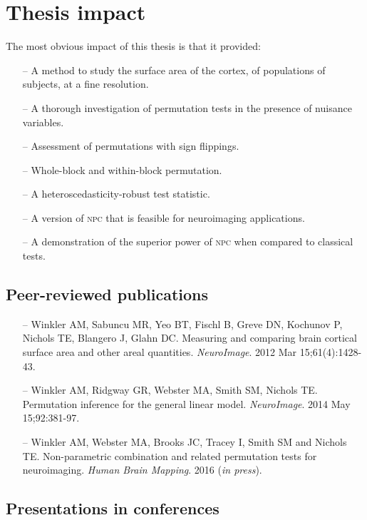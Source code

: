 \section{Thesis impact}

The most obvious impact of this thesis is that it provided:

\begin{itemize}
\item[--] A method to study the surface area of the cortex, of populations of subjects, at a fine resolution.
\item[--] A thorough investigation of permutation tests in the presence of nuisance variables.
\item[--] Assessment of permutations with sign flippings.
\item[--] Whole-block and within-block permutation.
\item[--] A heteroscedasticity-robust test statistic.
\item[--] A version of \textsc{npc} that is feasible for neuroimaging applications.
\item[--] A demonstration of the superior power of \textsc{npc} when compared to classical tests.	
\end{itemize}

\subsection{Peer-reviewed publications}

\begin{itemize}
\item[--] Winkler AM, Sabuncu MR, Yeo BT, Fischl B, Greve DN, Kochunov P, Nichols TE, Blangero J, Glahn DC. Measuring and comparing brain cortical surface area and other areal quantities. \emph{NeuroImage}. 2012 Mar 15;61(4):1428-43.
\item[--] Winkler AM, Ridgway GR, Webster MA, Smith SM, Nichols TE. Permutation inference for the general linear model. \emph{NeuroImage}. 2014 May 15;92:381-97.
\item[--] Winkler AM, Webster MA, Brooks JC, Tracey I, Smith SM and Nichols TE. Non-parametric combination and related permutation tests for neuroimaging. \emph{Human Brain Mapping}. 2016 (\emph{in press}).
\end{itemize}

\subsection{Presentations in conferences}

